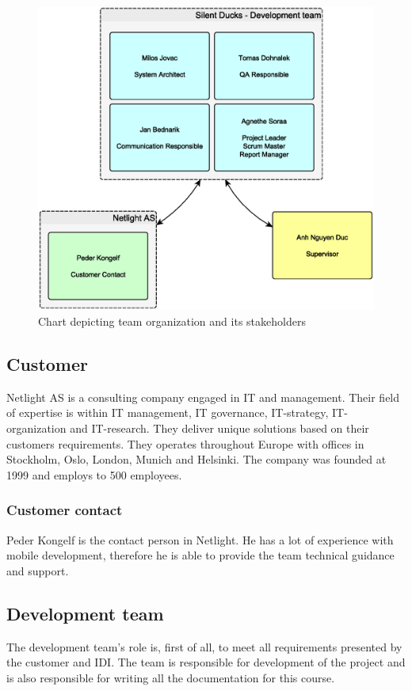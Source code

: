 \begin{figure}[!ht]
    \begin{center}
    \includegraphics[width=12cm]{images/organization_chart.eps}
    \caption[Oganization chart]{Chart depicting team organization and its stakeholders}
    \label{img:organization_chart}
    \end{center}
\end{figure}

\subsection{Customer}
Netlight AS is a consulting company engaged in IT and management. Their field of expertise is within IT management, IT governance, IT-strategy, IT-organization and IT-research. They deliver unique solutions based on their customers requirements. They operates throughout Europe with offices in Stockholm, Oslo, London, Munich and Helsinki. The company was founded at 1999 and employs to 500 employees. 
\subsubsection{Customer contact}
Peder Kongelf is the contact person in Netlight.
He has a lot of experience with mobile development, therefore he is able to provide the team technical guidance and support.

\subsection{Development team}
The development team's role is, first of all, to meet all requirements presented by the customer and IDI. 
The team is responsible for development of the project and is also responsible for writing all the documentation for this course.  

